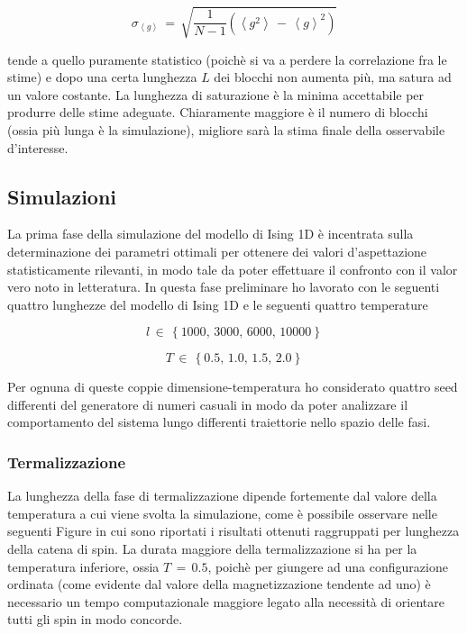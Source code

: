 \begin{equation}
    \sigma_{\left<g\right>}\,=\,\sqrt{\frac{1}{N-1}\left(\left<g^2\right>\,-\,\left<g\right>^2\right)}
    \label{eq: error_data_block}
\end{equation}

tende a quello puramente statistico (poichè si va a perdere la correlazione fra le stime) e dopo una certa lunghezza $L$ dei blocchi 
non aumenta più, ma satura ad un valore costante. La lunghezza di saturazione è la minima accettabile per produrre delle stime adeguate. 
Chiaramente maggiore è il numero di blocchi (ossia più lunga è la simulazione), migliore sarà la stima finale della osservabile 
d'interesse.





\subsection{Simulazioni}

La prima fase della simulazione del modello di Ising 1D è incentrata sulla determinazione dei parametri ottimali per ottenere 
dei valori d'aspettazione statisticamente rilevanti, in modo tale da poter effettuare il confronto con il valor vero noto in letteratura. In 
questa fase preliminare ho lavorato con le seguenti quattro lunghezze del modello di Ising 1D e le seguenti quattro temperature 

\begin{equation}
    l\,\in\,\left\{1000,\,3000,\,6000,\,10000\right\}
    \label{eq: dim_sim_Ising1D}
\end{equation}

\begin{equation}
    T\,\in\,\left\{0.5,\,1.0,\,1.5,\,2.0\right\}
    \label{eq: temp_sim_Ising1D}
\end{equation}

Per ognuna di queste coppie dimensione-temperatura ho considerato quattro seed differenti del generatore di numeri casuali in modo da 
poter analizzare il comportamento del sistema lungo differenti traiettorie nello spazio delle fasi. 



\subsubsection{Termalizzazione}

La lunghezza della fase di termalizzazione dipende fortemente dal valore della temperatura a cui viene svolta la simulazione, come è 
possibile osservare nelle seguenti Figure in cui sono riportati i risultati ottenuti raggruppati per lunghezza della catena di spin. 
La durata maggiore della termalizzazione si ha per la temperatura inferiore, ossia $T\,=\,0.5$, poichè per giungere ad una configurazione 
ordinata (come evidente dal valore della magnetizzazione tendente ad uno) è necessario un tempo computazionale maggiore legato alla 
necessità di orientare tutti gli spin in modo concorde.

